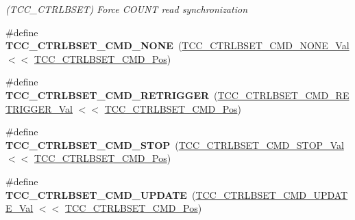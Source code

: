 \begin{DoxyCompactItemize}
\begin{DoxyCompactList}\small\item\em (T\+C\+C\+\_\+\+C\+T\+R\+L\+B\+S\+E\+T) Force C\+O\+U\+N\+T read synchronization \end{DoxyCompactList}\item 
\hypertarget{group___s_a_m_l21___t_c_c_gae589edf75d3b45c1b0a91847c9aa9964}{}\#define {\bfseries T\+C\+C\+\_\+\+C\+T\+R\+L\+B\+S\+E\+T\+\_\+\+C\+M\+D\+\_\+\+N\+O\+N\+E}~(\hyperlink{group___s_a_m_l21___t_c_c_gaee30d48439f42de18019d24103916ef2}{T\+C\+C\+\_\+\+C\+T\+R\+L\+B\+S\+E\+T\+\_\+\+C\+M\+D\+\_\+\+N\+O\+N\+E\+\_\+\+Val}     $<$$<$ \hyperlink{group___s_a_m_l21___t_c_c_ga67d1f1c91cc27fd3e6e38f740329a45a}{T\+C\+C\+\_\+\+C\+T\+R\+L\+B\+S\+E\+T\+\_\+\+C\+M\+D\+\_\+\+Pos})\label{group___s_a_m_l21___t_c_c_gae589edf75d3b45c1b0a91847c9aa9964}

\item 
\hypertarget{group___s_a_m_l21___t_c_c_ga88ee7ac7a8173f10658e826f346bca06}{}\#define {\bfseries T\+C\+C\+\_\+\+C\+T\+R\+L\+B\+S\+E\+T\+\_\+\+C\+M\+D\+\_\+\+R\+E\+T\+R\+I\+G\+G\+E\+R}~(\hyperlink{group___s_a_m_l21___t_c_c_ga5eb0ee96a9fc1d475a9e1c8b750551ac}{T\+C\+C\+\_\+\+C\+T\+R\+L\+B\+S\+E\+T\+\_\+\+C\+M\+D\+\_\+\+R\+E\+T\+R\+I\+G\+G\+E\+R\+\_\+\+Val} $<$$<$ \hyperlink{group___s_a_m_l21___t_c_c_ga67d1f1c91cc27fd3e6e38f740329a45a}{T\+C\+C\+\_\+\+C\+T\+R\+L\+B\+S\+E\+T\+\_\+\+C\+M\+D\+\_\+\+Pos})\label{group___s_a_m_l21___t_c_c_ga88ee7ac7a8173f10658e826f346bca06}

\item 
\hypertarget{group___s_a_m_l21___t_c_c_ga89330803bbcd5e57a6366d29f1cf10f7}{}\#define {\bfseries T\+C\+C\+\_\+\+C\+T\+R\+L\+B\+S\+E\+T\+\_\+\+C\+M\+D\+\_\+\+S\+T\+O\+P}~(\hyperlink{group___s_a_m_l21___t_c_c_ga18deff780417a2e186372a579405ec92}{T\+C\+C\+\_\+\+C\+T\+R\+L\+B\+S\+E\+T\+\_\+\+C\+M\+D\+\_\+\+S\+T\+O\+P\+\_\+\+Val}     $<$$<$ \hyperlink{group___s_a_m_l21___t_c_c_ga67d1f1c91cc27fd3e6e38f740329a45a}{T\+C\+C\+\_\+\+C\+T\+R\+L\+B\+S\+E\+T\+\_\+\+C\+M\+D\+\_\+\+Pos})\label{group___s_a_m_l21___t_c_c_ga89330803bbcd5e57a6366d29f1cf10f7}

\item 
\hypertarget{group___s_a_m_l21___t_c_c_ga0a0b2d28cd160f44b7e537c4938fa1b8}{}\#define {\bfseries T\+C\+C\+\_\+\+C\+T\+R\+L\+B\+S\+E\+T\+\_\+\+C\+M\+D\+\_\+\+U\+P\+D\+A\+T\+E}~(\hyperlink{group___s_a_m_l21___t_c_c_ga7545fc6153e0191ee8f497626039f764}{T\+C\+C\+\_\+\+C\+T\+R\+L\+B\+S\+E\+T\+\_\+\+C\+M\+D\+\_\+\+U\+P\+D\+A\+T\+E\+\_\+\+Val}   $<$$<$ \hyperlink{group___s_a_m_l21___t_c_c_ga67d1f1c91cc27fd3e6e38f740329a45a}{T\+C\+C\+\_\+\+C\+T\+R\+L\+B\+S\+E\+T\+\_\+\+C\+M\+D\+\_\+\+Pos})\label{group___s_a_m_l21___t_c_c_ga0a0b2d28cd160f44b7e537c4938fa1b8}


\end{DoxyCompactItemize}
